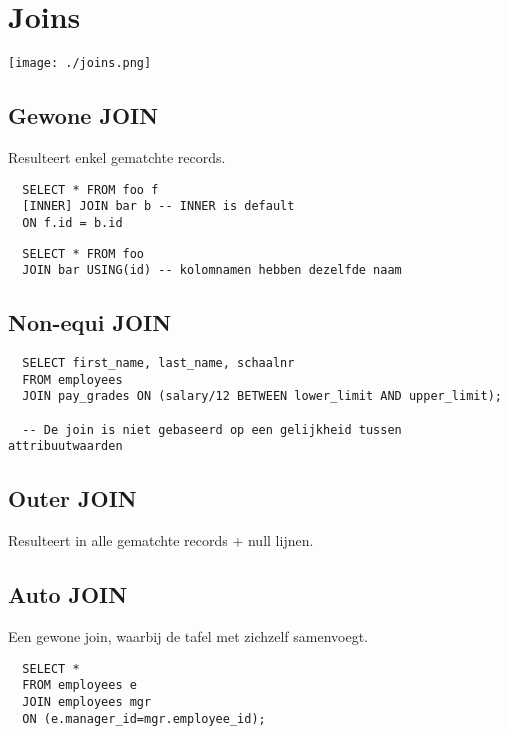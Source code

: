 \section{Joins}

\texttt{[image: ./joins.png]}

\subsection{Gewone JOIN}
Resulteert enkel gematchte records.
\begin{tiny}
\begin{lstlisting}
  SELECT * FROM foo f
  [INNER] JOIN bar b -- INNER is default
  ON f.id = b.id
\end{lstlisting}

\begin{lstlisting}
  SELECT * FROM foo
  JOIN bar USING(id) -- kolomnamen hebben dezelfde naam
\end{lstlisting}

\subsection{Non-equi JOIN}
\begin{lstlisting}
  SELECT first_name, last_name, schaalnr
  FROM employees
  JOIN pay_grades ON (salary/12 BETWEEN lower_limit AND upper_limit);

  -- De join is niet gebaseerd op een gelijkheid tussen attribuutwaarden
\end{lstlisting}
\end{tiny}

\subsection{Outer JOIN}
Resulteert in alle gematchte records + null lijnen.

\subsection{Auto JOIN}
Een gewone join, waarbij de tafel met zichzelf samenvoegt.

\begin{tiny}
\begin{lstlisting}
  SELECT *
  FROM employees e
  JOIN employees mgr
  ON (e.manager_id=mgr.employee_id);
\end{lstlisting}
\end{tiny}


